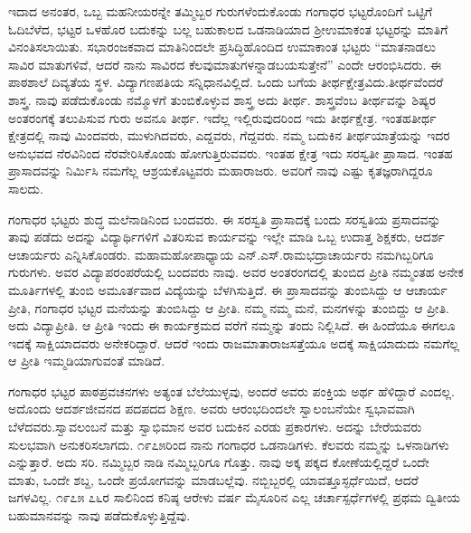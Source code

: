 {ಇದಾದ ಅನಂತರ, ಒಬ್ಬ ಮಹನೀಯರನ್ನೇ ತಮ್ಮಿಬ್ಬರ ಗುರುಗಳೆಂದು\-ಕೊಂಡು ಗಂಗಾಧರ ಭಟ್ಟರೊಂದಿಗೆ ಒಟ್ಟಿಗೆ ಓದಿ\enginline{-}ಬೆಳೆದ, ಭಟ್ಟರ ಒಳಹೊರ ಬದುಕನ್ನು ಬಲ್ಲ ಬಹುಕಾಲದ ಒಡನಾಡಿಯಾದ ಶ್ರೀಉಮಾಕಂತ ಭಟ್ಟರನ್ನು ಮಾತಿಗೆ ವಿನಂತಿಸ\-ಲಾಯಿತು. ಸಭಾರಂಜಕವಾದ ಮಾತಿನಿಂದಲೇ ಪ್ರಸಿದ್ಧಿಹೊಂದಿದ ಉಮಾಕಾಂತ ಭಟ್ಟರು “ಮಾತನಾಡಲು ಸಾವಿರ ಮಾತುಗಳಿವೆ, ಆದರೆ ನಾನು ಸಾವಿರದ ಕೆಲವು\break ಮಾತುಗಳನ್ನಾಡಬಯಸುತ್ತೇನೆ” ಎಂದೇ ಆರಂಭಿಸಿದರು. ಈ ಪಾಠಶಾಲೆ ದಿವ್ಯತೆಯ ಸ್ಥಳ. ವಿದ್ಯಾಗಣಪತಿಯ ಸನ್ನಿಧಾನವಿಲ್ಲಿದೆ. ಒಂದು ಬಗೆಯ ತೀರ್ಥಕ್ಷೇತ್ರವಿದು.\break ತೀರ್ಥವೆಂದರೆ ಶಾಸ್ತ್ರ. ನಾವು ಪಡೆದುಕೊಂಡು ನಮ್ಮೊಳಗೆ ತುಂಬಿಕೊಳ್ಳುವ ಶಾಸ್ತ್ರ \enginline{-} ಅದು ತೀರ್ಥ. ಶಾಸ್ತ್ರವೆಂಬ ತೀರ್ಥವನ್ನು ಶಿಷ್ಯರ ಅಂತರಂಗಕ್ಕೆ ತಲುಪಿಸುವ ಗುರು \enginline{-} ಅವನೂ ತೀರ್ಥ. ಇದೆಲ್ಲ ಇಲ್ಲಿರುವುದರಿಂದ ಇದು ತೀರ್ಥಕ್ಷೇತ್ರ. ಇಂತಹ\break ತೀರ್ಥ ಕ್ಷೇತ್ರದಲ್ಲಿ ನಾವು ಮಿಂದವರು, ಮುಳುಗಿದವರು, ಎದ್ದವರು, ಗೆದ್ದವರು. ನಮ್ಮ ಬದುಕಿನ ತೀರ್ಥ\-ಯಾತ್ರೆಯನ್ನು ಇದರ ಅನುಭವದ ನೆರವಿನಿಂದ ನೆರವೇರಿಸಿಕೊಂಡು ಹೋಗುತ್ತಿರು\-ವವರು. ಇಂತಹ ಕ್ಷೇತ್ರ \enginline{-}  ಇದು ಸರಸ್ವತೀ ಪ್ರಾಸಾದ. ಇಂತಹ ಪ್ರಾಸಾದವನ್ನು ನಿರ್ಮಿಸಿ ನಮಗೆಲ್ಲ ಆಶ್ರಯಕೊಟ್ಟವರು ಮಹಾರಾಜರು. ಅವರಿಗೆ ನಾವು ಎಷ್ಟು ಕೃತಜ್ಞ\-ರಾಗಿದ್ದರೂ ಸಾಲದು.

ಗಂಗಾಧರ ಭಟ್ಟರು ಶುದ್ಧ ಮಲೆನಾಡಿನಿಂದ ಬಂದವರು. ಈ ಸರಸ್ವತಿ ಪ್ರಾಸಾದಕ್ಕೆ ಬಂದು ಸರಸ್ವತಿಯ ಪ್ರಸಾದವನ್ನು ತಾವು ಪಡೆದು ಅದನ್ನು ವಿದ್ಯಾರ್ಥಿಗಳಿಗೆ ವಿತರಿಸುವ ಕಾರ್ಯವನ್ನು ಇಲ್ಲೇ ಮಾಡಿ ಒಬ್ಬ ಉದಾತ್ತ ಶಿಕ್ಷಕರು, ಆದರ್ಶ ಆಚಾರ್ಯರು ಎನ್ನಿಸಿಕೊಂಡರು. ಮಹಾಮಹೋಪಾಧ್ಯಾಯ ಎನ್.ಎಸ್.ರಾಮಭದ್ರಾಚಾರ್ಯರು ನಮಗಿಬ್ಬರಿಗೂ ಗುರುಗಳು. ಅವರ ವಿದ್ಯಾಪರಂಪರೆಯಲ್ಲಿ  ಬಂದವರು ನಾವು. ಅವರ ಅಂತರಂಗದಲ್ಲಿ ತುಂಬಿದ ಪ್ರೀತಿ ನಮ್ಮಂತಹ ಅನೇಕ ಮೂರ್ತಿಗಳಲ್ಲಿ ತುಂಬಿ ಅಮೂರ್ತ\-ವಾದ ವಿದ್ಯೆಯನ್ನು ಬೆಳಗಿಸುತ್ತಿದೆ. ಈ ಪ್ರಾಸಾದವನ್ನು ತುಂಬಿಸಿದ್ದು ಆ ಆಚಾರ್ಯ ಪ್ರೀತಿ,  ಗಂಗಾಧರ ಭಟ್ಟರ ಮನೆಯನ್ನು ತುಂಬಿಸಿದ್ದು ಆ ಪ್ರೀತಿ. ನಮ್ಮ ನಮ್ಮ ಮನೆ, ಮನಗಳನ್ನು ತುಂಬಿದ್ದು ಆ ಪ್ರೀತಿ. ಅದು ವಿದ್ಯಾಪ್ರೀತಿ. ಆ ಪ್ರೀತಿ ಇಂದು ಈ ಕಾರ್ಯಕ್ರಮದ ವರೆಗೆ ನಮ್ಮನ್ನು ತಂದು ನಿಲ್ಲಿಸಿದೆ. ಈ ಹಿಂದೆಯೂ ಈಗಲೂ ಇದಕ್ಕೆ ಸಾಕ್ಷಿಯಾದವರು ಅನೇಕರಿದ್ದಾರೆ. ಆದರೆ ಇಂದು ರಾಜಮಾತಾ\enginline{-}ರಾಜಸತ್ತೆಯೂ ಅದಕ್ಕೆ ಸಾಕ್ಷಿಯಾದುದು ನಮಗೆಲ್ಲ ಆ ಪ್ರೀತಿ ಇಮ್ಮಡಿಯಾಗುವಂತೆ ಮಾಡಿದೆ.

ಗಂಗಾಧರ ಭಟ್ಟರ ಪಾಠಪ್ರವಚನಗಳು ಅತ್ಯಂತ ಬೆಲೆಯುಳ್ಳವು, ಅಂದರೆ ಅವರು ಪಂಕ್ತಿಯ ಅರ್ಥ ಹೆಳಿದ್ದಾರೆ ಎಂದಲ್ಲ.  ಅದೊಂದು ಆದರ್ಶಜೀವನದ ಪದ\enginline{-}ಪದದ ಶಿಕ್ಷಣ. ಅವರು ಆರಂಭದಿಂದಲೇ ಸ್ವಾಲಂಬನೆಯೇ ಸ್ವಭಾವವಾಗಿ ಬೆಳೆದವರು.\break ಸ್ವಾವಲಂಬನೆ ಮತ್ತು ಸ್ವಾಭಿಮಾನ ಅವರ ಬದುಕಿನ ಎರಡು ಪ್ರಕಾರಗಳು. ಅದನ್ನು ಬೇರೆಯವರು ಸುಲಭವಾಗಿ ಅನುಕರಿಸಲಾಗದು. ೧೯೭೫ರಿಂದ ನಾನು ಗಂಗಾಧರ ಒಡನಾಡಿಗಳು. ಕೆಲವರು ನಮ್ಮನ್ನು ಒಳನಾಡಿಗಳು ಎನ್ನುತ್ತಾರೆ. ಅದು ಸರಿ. ನಮ್ಮಿಬ್ಬರ ನಾಡಿ ನಮ್ಮಿಬ್ಬರಿಗೂ ಗೊತ್ತು. ನಾವು ಅಕ್ಕ ಪಕ್ಕದ ಕೋಣೆಯಲ್ಲಿದ್ದರೆ ಒಂದೇ ಮಾತು, ಒಂದೇ ಶಬ್ದ, ಒಂದೇ ಪ್ರಯೋಗವನ್ನು ಮಾಡಬಲ್ಲೆವು. ನಬ್ಬಿಬ್ಬರಲ್ಲಿ ಯಾವತ್ತೂ\break ಸ್ಫರ್ಧೆಯಿದೆ, ಆದರೆ ಜಗಳವಿಲ್ಲ. ೧೯೭೫ \enginline{-}೭೬ರ ಸಾಲಿನಿಂದ ಕನಿಷ್ಠ ಆರೇಳು ವರ್ಷ ಮೈಸೂರಿನ ಎಲ್ಲ ಚರ್ಚಾಸ್ಪರ್ಧೆಗಳಲ್ಲಿ ಪ್ರಥಮ ದ್ವಿತೀಯ ಬಹುಮಾನವನ್ನು ನಾವು ಪಡೆದು\-ಕೊಳ್ಳುತ್ತಿದ್ದೆವು.

}
